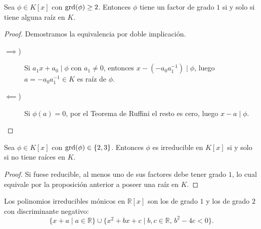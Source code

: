 \begin{prop}\label{propFactorGrd1Raiz}
    Sea $\phi \in K[x]$ con $\operatorname{grd}(\phi) \geq 2$. Entonces $\phi$ tiene un factor de grado $1$ si y solo si tiene alguna raíz en $K$.
\end{prop}
\begin{proof}Demostramos la equivalencia por doble implicación.
\begin{description}
    \item[$\implies$)] Si $a_1 x + a_0 \mid \phi$ con $a_1 \neq 0$, entonces $x - (-a_0 a_1^{-1}) \mid \phi$, luego $a = -a_0 a_1^{-1} \in K$ es raíz de $\phi$.

    \item[$\impliedby$)] Si $\phi(a) = 0$, por el Teorema de Ruffini el resto es cero, luego $x - a \mid \phi$.
\end{description}
\end{proof}

\begin{coro}\label{corCritRaiz}
    Sea $\phi \in K[x]$ con $\operatorname{grd}(\phi) \in \{2, 3\}$. Entonces $\phi$ es irreducible en $K[x]$ si y solo si no tiene raíces en $K$.
\end{coro}

\begin{proof}
    Si fuese reducible, al menos uno de sus factores debe tener grado $1$, lo cual equivale por la proposición anterior a poseer una raíz en $K$.
\end{proof}

\begin{teo}
    Los polinomios irreducibles mónicos en $\mathbb{R}[x]$ son los de grado $1$ y los de grado $2$ con discriminante negativo:
    \[
        \{x + a \mid a \in \mathbb{R}\} \cup \{x^2 + bx + c \mid b, c \in \mathbb{R}, \, b^2 - 4c < 0\}.
    \]
\end{teo}

